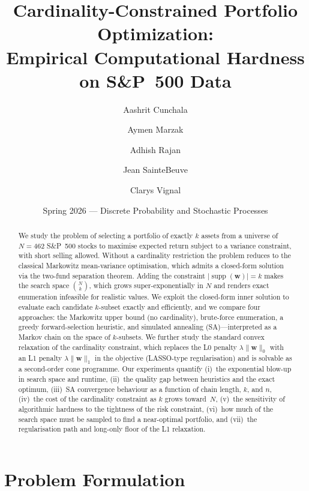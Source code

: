 \documentclass[11pt]{article}
\title{\textbf{Cardinality-Constrained Portfolio Optimization:\\[4pt]
Empirical Computational Hardness on S\&P~500 Data}}
\author{Aashrit Cunchala \and Aymen Marzak \and Adhish Rajan \and Jean SainteBeuve \and Clarys Vignal}
\date{Spring 2026 \quad --- \quad Discrete Probability and Stochastic Processes}
\begin{document}
\maketitle

\begin{abstract}
We study the problem of selecting a portfolio of exactly $k$ assets from a
universe of $N=462$ S\&P~500 stocks to maximise expected return subject
to a variance constraint, with short selling allowed.  Without a cardinality
restriction the problem reduces to the classical Markowitz mean-variance
optimisation, which admits a closed-form solution via the two-fund separation
theorem.  Adding the constraint $|\operatorname{supp}(\mathbf{w})|=k$ makes the
search space $\binom{N}{k}$, which grows super-exponentially in $N$ and renders
exact enumeration infeasible for realistic values.  We exploit the closed-form
inner solution to evaluate each candidate $k$-subset exactly and efficiently, and
we compare four approaches: the Markowitz upper bound (no cardinality), brute-force
enumeration, a greedy forward-selection heuristic, and simulated annealing
(SA)---interpreted as a Markov chain on the space of $k$-subsets.  We further
study the standard convex relaxation of the cardinality constraint, which replaces
the L0 penalty $\lambda\|\mathbf{w}\|_0$ with an L1 penalty $\lambda\|\mathbf{w}\|_1$
in the objective (LASSO-type regularisation) and is solvable as a second-order cone
programme.  Our experiments quantify (i)~the exponential blow-up in search space
and runtime, (ii)~the quality gap between heuristics and the exact optimum,
(iii)~SA convergence behaviour as a function of chain length, $k$, and $n$,
(iv)~the cost of the cardinality constraint as $k$ grows toward~$N$,
(v)~the sensitivity of algorithmic hardness to the tightness of the risk constraint,
(vi)~how much of the search space must be sampled to find a near-optimal portfolio,
and (vii)~the regularisation path and long-only floor of the L1 relaxation.
\end{abstract}

\section{Problem Formulation}
\label{sec:formulation}
\end{document}

